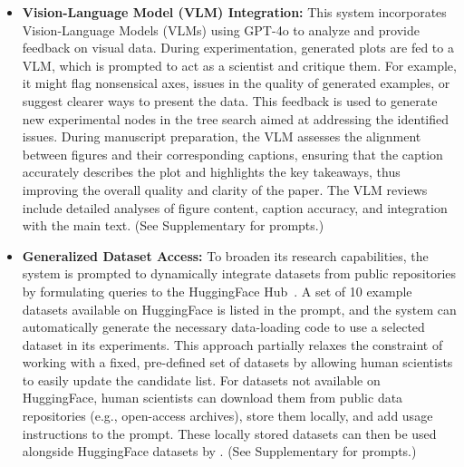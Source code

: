 \begin{itemize}
The structured design of experiment stages and tailored node types facilitates systematic exploration across all stages.
Unlike some LLM agents that rigidly follow predefined, fine-grained workflow graphs, the \ouralgo adopts a looser structure that guides the entire empirical research cycle, enabling flexible system behavior while maintaining coherence across iterative stages.
See Supplementary  and  for the prompts and detailed hyperparameters, respectively.


    \item \textbf{Vision-Language Model (VLM) Integration:} This system incorporates Vision-Language Models (VLMs) using GPT-4o
    to analyze and provide feedback on visual data. During experimentation, generated plots are fed to a VLM, which is prompted to act as a scientist and critique them.
    For example, it might flag nonsensical axes, issues in the quality of generated examples, or suggest clearer ways to present the data.
    This feedback is used to generate new experimental nodes in the tree search aimed at addressing the identified issues. During manuscript preparation, the VLM assesses the alignment between figures and their corresponding captions, ensuring that the caption accurately describes the plot and highlights the key takeaways, thus improving the overall quality and clarity of the paper. The VLM reviews include detailed analyses of figure content, caption accuracy, and integration with the main text.
    (See Supplementary  for prompts.)

    \item \textbf{Generalized Dataset Access:}
    To broaden its research capabilities, the system is prompted to dynamically integrate datasets from public repositories by formulating queries to the HuggingFace Hub~\citep{wolf2020huggingface}.
    A set of 10 example datasets available on HuggingFace is listed in the prompt, and the system can automatically generate the necessary data-loading code to use a selected dataset in its experiments.
    This approach partially relaxes the constraint of working with a fixed, pre-defined set of datasets by allowing human scientists to easily update the candidate list.
    For datasets not available on HuggingFace, human scientists can download them from public data repositories (e.g., open-access archives), store them locally, and add usage instructions to the prompt. These locally stored datasets can then be used alongside HuggingFace datasets by \ouralgo.
    (See Supplementary  for prompts.)


\end{itemize}
